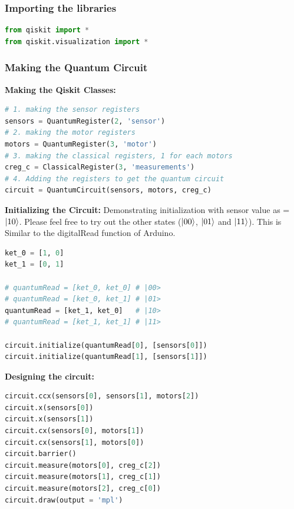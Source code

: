 \subsubsection{Importing the libraries}
\label{code:importing_the_libraries}
\begin{lstlisting}[language=Python]
from qiskit import *
from qiskit.visualization import *\end{lstlisting}

\subsubsection{Making the Quantum Circuit}
\textbf{Making the Qiskit Classes:}
\label{code:making_the_qiskit_classes}
\begin{lstlisting}[language=Python]
# 1. making the sensor registers
sensors = QuantumRegister(2, 'sensor')
# 2. making the motor registers
motors = QuantumRegister(3, 'motor')
# 3. making the classical registers, 1 for each motors
creg_c = ClassicalRegister(3, 'measurements')
# 4. Adding the registers to get the quantum circuit
circuit = QuantumCircuit(sensors, motors, creg_c)\end{lstlisting}
\vspace{3mm}

\textbf{Initializing the Circuit:} Demonstrating initialization with sensor value as = $\ket{10}$. Please feel free to try out the other states ($\ket{00}$, $\ket{01}$ and $\ket{11}$). This is Similar to the digitalRead function of Arduino.
\label{code:initializing_the_circuit}
\begin{lstlisting}[language=Python]
ket_0 = [1, 0]
ket_1 = [0, 1]

# quantumRead = [ket_0, ket_0] # |00>
# quantumRead = [ket_0, ket_1] # |01>
quantumRead = [ket_1, ket_0]   # |10>
# quantumRead = [ket_1, ket_1] # |11>

circuit.initialize(quantumRead[0], [sensors[0]])
circuit.initialize(quantumRead[1], [sensors[1]])\end{lstlisting}
\vspace{3mm}

\textbf{Designing the circuit:}
\label{code:designing_the_circuit}
\begin{lstlisting}[language=Python]
circuit.ccx(sensors[0], sensors[1], motors[2])
circuit.x(sensors[0])
circuit.x(sensors[1])
circuit.cx(sensors[0], motors[1])
circuit.cx(sensors[1], motors[0])
circuit.barrier()
circuit.measure(motors[0], creg_c[2])
circuit.measure(motors[1], creg_c[1])
circuit.measure(motors[2], creg_c[0])
circuit.draw(output = 'mpl')\end{lstlisting}

